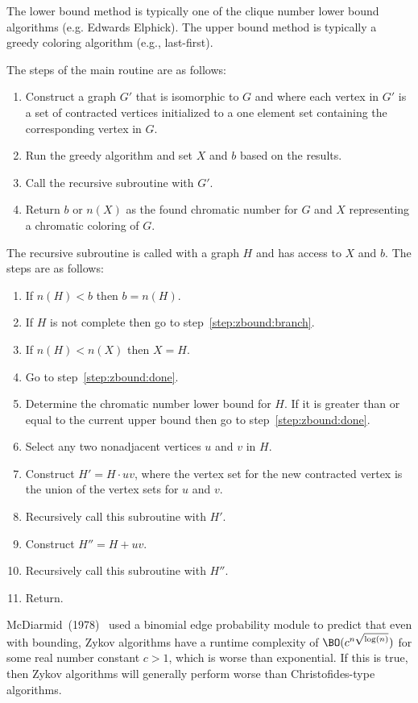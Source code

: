 The lower bound method is typically one of the clique number lower bound algorithms (e.g. Edwards Elphick).  The
upper bound method is typically a greedy coloring algorithm (e.g., last-first).

The steps of the main routine are as follows:
\begin{enumerate}
\item Construct a graph \(G'\) that is isomorphic to \(G\) and where each vertex in \(G'\) is a set of contracted
  vertices initialized to a one element set containing the corresponding vertex in \(G\).
\item Run the greedy algorithm and set \(X\) and \(b\) based on the results.
\item Call the recursive subroutine with \(G'\).
\item Return \(b\) or \(n(X)\) as the found chromatic number for \(G\) and \(X\) representing a chromatic coloring
  of \(G\).
\end{enumerate}

The recursive subroutine is called with a graph \(H\) and has access to \(X\) and \(b\).  The steps are as follows:
\begin{enumerate}
\item If \(n(H)<b\) then \(b=n(H)\).
\item If \(H\) is not complete then go to step~\ref{step:zbound:branch}.
\item If \(n(H)<n(X)\) then \(X=H\).
\item Go to step~\ref{step:zbound:done}.
\item\label{step:zbound:lower} Determine the chromatic number lower bound for \(H\).  If it is greater than or
  equal to the current upper bound then go to step~\ref{step:zbound:done}.
\item\label{step:zbound:branch} Select any two nonadjacent vertices \(u\) and \(v\) in \(H\).
\item Construct \(H'=H\cdot uv\), where the vertex set for the new contracted vertex is the union of the vertex
  sets for \(u\) and \(v\).
\item Recursively call this subroutine with \(H'\).
\item Construct \(H''=H+uv\).
\item Recursively call this subroutine with \(H''\).
\item\label{step:zbound:done} Return.
\end{enumerate}

McDiarmid~(1978)~\cite{mcdiarmid} used a binomial edge probability module to predict that even with bounding, Zykov
algorithms have a runtime complexity of \(\BO(c^{n\sqrt{\log(n)}})\) for some real number constant \(c>1\), which
is worse than exponential.  If this is true, then Zykov algorithms will generally perform worse than
Christofides-type algorithms.

